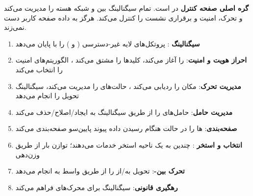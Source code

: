  \textbf{گره اصلی صفحه کنترل} در  است. تمام سیگنالینگ بین  و شبکه هسته را مدیریت می‌کند و تحرک، امنیت و برقراری نشست را کنترل می‌کند.  هرگز به داده صفحه کاربر دست نمی‌زند.


\begin{enumerate}
\def\labelenumi{\arabic{enumi}.}
\tightlist
\item
  \textbf{سیگنالینگ }: پروتکل‌های لایه غیر-دسترسی ( و ) را با  پایان می‌دهد
\item
  \textbf{احراز هویت و امنیت}:  را آغاز می‌کند، کلیدها را مشتق می‌کند ، الگوریتم‌های امنیت  را انتخاب می‌کند
\item
  \textbf{مدیریت تحرک}: مکان  را ردیابی می‌کند ، حالت‌های  را مدیریت می‌کند، سیگنالینگ تحویل را انجام می‌دهد
\item
  \textbf{مدیریت حامل}: حامل‌های  را از طریق سیگنالینگ  به  ایجاد/\allowbreak{}اصلاح/\allowbreak{}حذف می‌کند
\item
  \textbf{صفحه‌بندی}: ها را در حالت  هنگام رسیدن داده پیوند پایین‌سو صفحه‌بندی می‌کند
\item
  \textbf{انتخاب و استخر }: چندین  به یک ناحیه استخر خدمات می‌دهند؛ توازن بار از طریق وزن‌دهی 
\item
  \textbf{تحرک بین-}: تحویل به/\allowbreak{}از  را از طریق واسط  به  انجام می‌دهد
\item
  \textbf{رهگیری قانونی}: سیگنالینگ برای محرک‌های  فراهم می‌کند
\end{enumerate}



